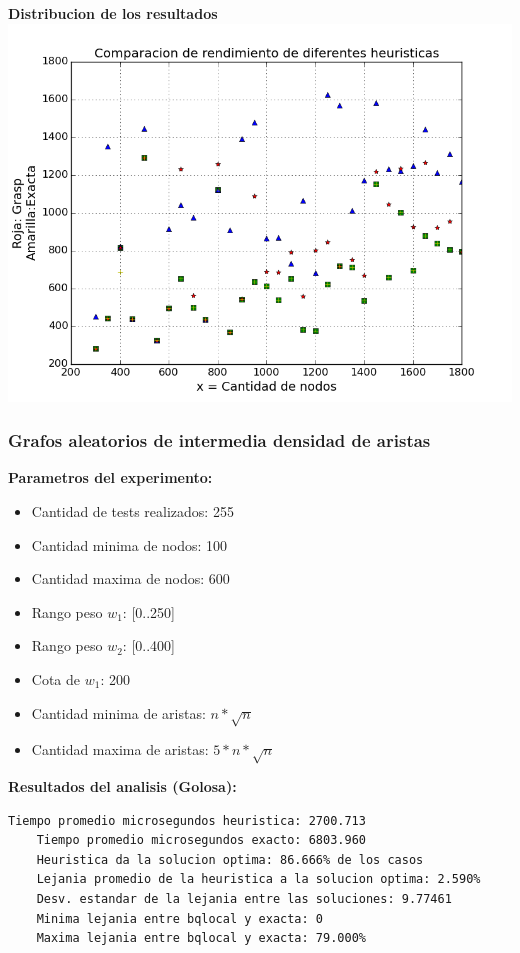 \begin{center}	
	\textbf{Distribucion de los resultados}\\
	\includegraphics[scale=0.7]{experimentos/performance-optimalidad-lineales-beta_n_over_128/comparacion_optimalidad.png}
\end{center}


\subsubsection{Grafos aleatorios de intermedia densidad de aristas}
\textbf{Parametros del experimento:}
\begin{itemize}
	\item Cantidad de tests realizados: 255
	\item Cantidad minima de nodos: 100
	\item Cantidad maxima de nodos: 600
	\item Rango peso $w_1$: [0..250]
	\item Rango peso $w_2$: [0..400]
	\item Cota de $w_1$: 200
	\item Cantidad minima de aristas: $ n * \sqrt n$
	\item Cantidad maxima de aristas: $ 5 * n * \sqrt n$
\end{itemize}

\vspace{1cm}

\textbf{Resultados del analisis (Golosa):}
\begin{lstlisting}[frame=single]	
	Tiempo promedio microsegundos heuristica: 2700.713
	Tiempo promedio microsegundos exacto: 6803.960
	Heuristica da la solucion optima: 86.666% de los casos
	Lejania promedio de la heuristica a la solucion optima: 2.590%
	Desv. estandar de la lejania entre las soluciones: 9.77461
	Minima lejania entre bqlocal y exacta: 0
	Maxima lejania entre bqlocal y exacta: 79.000%
\end{lstlisting}

